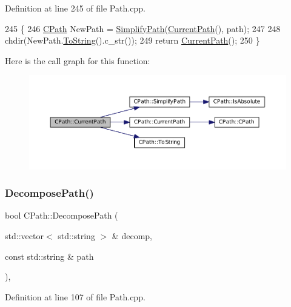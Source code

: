 Definition at line 245 of file Path.\+cpp.


\begin{DoxyCode}
245                                          \{
246     \hyperlink{classCPath}{CPath} NewPath = \hyperlink{classCPath_af0213a2ea0de0498ded236137e759922}{SimplifyPath}(\hyperlink{classCPath_a5161b834e754b217ddead2437eaaa223}{CurrentPath}(), path);
247     
248     chdir(NewPath.\hyperlink{classCPath_abbafaf377a7e38e0151bd9567d526951}{ToString}().c\_str());
249     \textcolor{keywordflow}{return} \hyperlink{classCPath_a5161b834e754b217ddead2437eaaa223}{CurrentPath}();
250 \}
\end{DoxyCode}
Here is the call graph for this function\+:
\nopagebreak
\begin{figure}[H]
\begin{center}
\leavevmode
\includegraphics[width=350pt]{classCPath_a87ec01e5af0eb4e2184caf1d9ecc8892_cgraph}
\end{center}
\end{figure}
\hypertarget{classCPath_aae05f3c3502e92bf68d5ce71264c7bb9}{}\label{classCPath_aae05f3c3502e92bf68d5ce71264c7bb9} 
\subsubsection{\texorpdfstring{Decompose\+Path()}{DecomposePath()}}
{\footnotesize\ttfamily bool C\+Path\+::\+Decompose\+Path (\begin{DoxyParamCaption}\item[{std\+::vector$<$ std\+::string $>$ \&}]{decomp,  }\item[{const std\+::string \&}]{path }\end{DoxyParamCaption})\hspace{0.3cm}{\ttfamily [static]}, {\ttfamily [protected]}}



Definition at line 107 of file Path.\+cpp.


